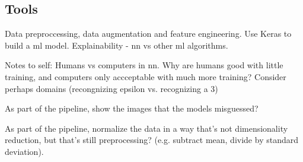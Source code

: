 \subsection{Tools}\label{subsec:tools}
Data preproccessing, data augmentation and feature engineering. Use Keras to build a \gls{ml} model. Explainability - \gls{nn} vs other \gls{ml} algorithms.

Notes to self: Humans vs computers in \gls{nn}. Why are humans good with little training, and computers only accceptable with much more training? Consider perhaps domains (recongnizing epsilon vs. recognizing a 3)

As part of the pipeline, show the images that the models misguessed?

As part of the pipeline, normalize the data in a way that's not dimensionality reduction, but that's still preprocessing? (e.g. subtract mean, divide by standard deviation).

